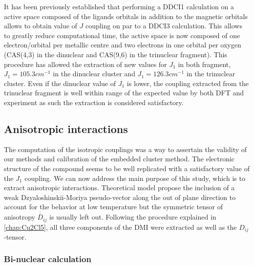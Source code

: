 \documentclass[12pt]{report}
\numberwithin{equation}{section}
\begin{document}
It has been previously established that performing a DDCI1 calculation on a active space composed of the ligands orbitals in addition to the magnetic orbitals allows to obtain value of $J$ coupling on par to a DDCI3 calculation.
This allows to greatly reduce computational time, the active space is now composed of one electron/orbital per metallic centre and two electrons in one orbital per oxygen (CAS(4,3) in the dinuclear and CAS(9,6) in the trinuclear fragment).
This procedure has allowed the extraction of new values for $J_1$ in both fragment, $J_1=105.3 cm^{-1}$ in the dinuclear cluster and $J_1=126.3 cm^{-1}$ in the trinuclear cluster.
Even if the dinuclear value of $J_1$ is lower, the coupling extracted from the trinuclear fragment is well within range of the expected value by both DFT and experiment as such the extraction is considered satisfactory.




\subsection{Anisotropic interactions}

The computation of the isotropic couplings was a way to assertain the validity of our methods and calibration of the embedded cluster method.
The electronic structure of the compound seems to be well replicated with a satisfactory value of the $J_1$ coupling.
We can now address the main purpose of this study, which is to extract anisotropic interactions.
Theoretical model propose the inclusion of a weak Dzyaloshinskii-Moriya pseudo-vector along the out of plane direction to account for the behavior at low temperature but the symmetric tensor of anisotropy $\overline{\overline{D}}_{ij}$ is usually left out.
Following the procedure explained in \ref{chap:Cu2Cl5}, all three components of the DMI were extracted as well as the $D_{ij}$-tensor.


\subsubsection*{Bi-nuclear calculation}
\end{document}
